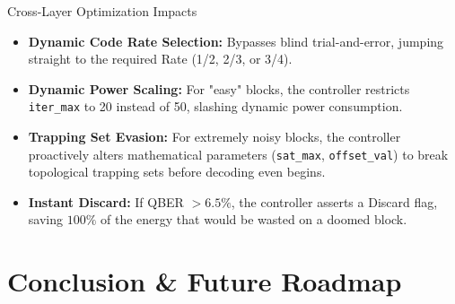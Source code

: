 \documentclass[t, aspectratio=169]{beamer}
\begin{document}
	\begin{frame}{Cross-Layer Optimization Impacts}
		\begin{itemize}
			\item \textbf{Dynamic Code Rate Selection:} Bypasses blind trial-and-error, jumping straight to the required Rate (1/2, 2/3, or 3/4).
			\item \textbf{Dynamic Power Scaling:} For "easy" blocks, the controller restricts \texttt{iter\_max} to 20 instead of 50, slashing dynamic power consumption.
			\item \textbf{Trapping Set Evasion:} For extremely noisy blocks, the controller proactively alters mathematical parameters (\texttt{sat\_max}, \texttt{offset\_val}) to break topological trapping sets before decoding even begins.
			\item \textbf{Instant Discard:} If QBER $> 6.5\%$, the controller asserts a Discard flag, saving $100\%$ of the energy that would be wasted on a doomed block.
		\end{itemize}
	\end{frame}

	\section{Conclusion \& Future Roadmap}
	\useStyleHustFull
	\useThinBar 
	
\end{document}
